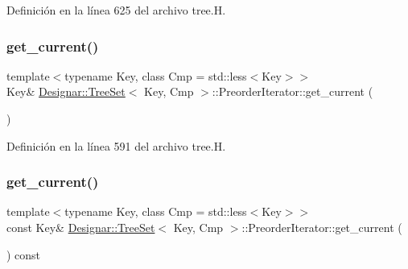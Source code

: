 Definición en la línea 625 del archivo tree.\+H.

\mbox{\label{class_designar_1_1_tree_set_1_1_preorder_iterator_a46bb02ac787f59ccd00eb1dc9ec360d1}} 
\subsubsection{\texorpdfstring{get\+\_\+current()}{get\_current()}\hspace{0.1cm}{\footnotesize\ttfamily [1/2]}}
{\footnotesize\ttfamily template$<$typename Key, class Cmp = std\+::less$<$\+Key$>$$>$ \\
Key\& \hyperlink{class_designar_1_1_tree_set}{Designar\+::\+Tree\+Set}$<$ Key, Cmp $>$\+::Preorder\+Iterator\+::get\+\_\+current (\begin{DoxyParamCaption}{ }\end{DoxyParamCaption})\hspace{0.3cm}{\ttfamily [inline]}}



Definición en la línea 591 del archivo tree.\+H.

\mbox{\label{class_designar_1_1_tree_set_1_1_preorder_iterator_a1361ceae79bd57279177e2a1a76ee200}} 
\subsubsection{\texorpdfstring{get\+\_\+current()}{get\_current()}\hspace{0.1cm}{\footnotesize\ttfamily [2/2]}}
{\footnotesize\ttfamily template$<$typename Key, class Cmp = std\+::less$<$\+Key$>$$>$ \\
const Key\& \hyperlink{class_designar_1_1_tree_set}{Designar\+::\+Tree\+Set}$<$ Key, Cmp $>$\+::Preorder\+Iterator\+::get\+\_\+current (\begin{DoxyParamCaption}{ }\end{DoxyParamCaption}) const\hspace{0.3cm}{\ttfamily [inline]}}



